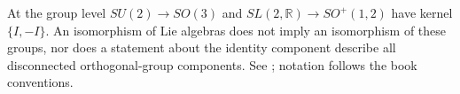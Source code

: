 At the group level $SU(2)\to SO(3)$ and
$SL(2,\mathbb R)\to SO^+(1,2)$ have kernel $\{I,-I\}$.
An isomorphism of Lie algebras does not imply an isomorphism of these
groups, nor does a statement about the identity component describe
all disconnected orthogonal-group components.
See \cite[Section~7]{KocikFeynman}; notation follows the book conventions.

